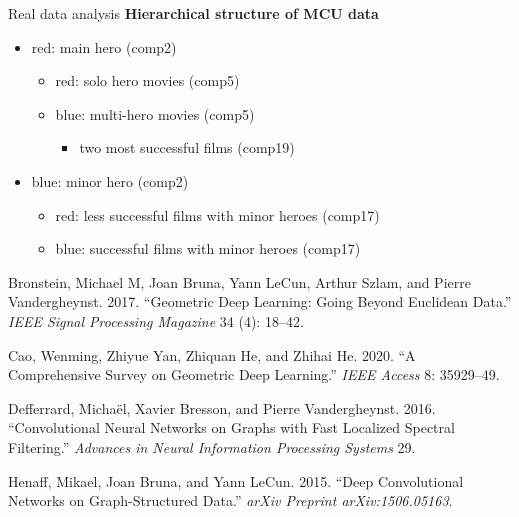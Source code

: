 \documentclass[
  ignorenonframetext,
]{beamer}
\providecommand{\tightlist}{%
  \setlength{\itemsep}{0pt}\setlength{\parskip}{0pt}}\usepackage{longtable,booktabs,array}
\newlength{\cslhangindent}
\newenvironment{CSLReferences}[2] %
 {\begin{list}{}{%
  \setlength{\itemindent}{0pt}
  \setlength{\leftmargin}{0pt}
  \setlength{\parsep}{0pt}
  \ifodd #1
   \setlength{\leftmargin}{\cslhangindent}
   \setlength{\itemindent}{-1\cslhangindent}
  \fi
  \setlength{\itemsep}{#2\baselineskip}}}
 {\end{list}}
\begin{document}
\begin{frame}{Real data analysis}
\label{real-data-analysis-7}
\textbf{Hierarchical structure of MCU data}

\begin{itemize}
\tightlist
\item
  red: main hero (comp2)

  \begin{itemize}
  \tightlist
  \item
    red: solo hero movies (comp5)
  \item
    blue: multi-hero movies (comp5)

    \begin{itemize}
    \tightlist
    \item
      two most successful films (comp19)
    \end{itemize}
  \end{itemize}
\item
  blue: minor hero (comp2)

  \begin{itemize}
  \tightlist
  \item
    red: less successful films with minor heroes (comp17)
  \item
    blue: successful films with minor heroes (comp17)
  \end{itemize}
\end{itemize}

\label{refs}
\begin{CSLReferences}{1}{0}
Bronstein, Michael M, Joan Bruna, Yann LeCun, Arthur Szlam, and Pierre
Vandergheynst. 2017. {``Geometric Deep Learning: Going Beyond Euclidean
Data.''} \emph{IEEE Signal Processing Magazine} 34 (4): 18--42.

Cao, Wenming, Zhiyue Yan, Zhiquan He, and Zhihai He. 2020. {``A
Comprehensive Survey on Geometric Deep Learning.''} \emph{IEEE Access}
8: 35929--49.

Defferrard, Michaël, Xavier Bresson, and Pierre Vandergheynst. 2016.
{``Convolutional Neural Networks on Graphs with Fast Localized Spectral
Filtering.''} \emph{Advances in Neural Information Processing Systems}
29.

Henaff, Mikael, Joan Bruna, and Yann LeCun. 2015. {``Deep Convolutional
Networks on Graph-Structured Data.''} \emph{arXiv Preprint
arXiv:1506.05163}.


\end{CSLReferences}
\end{frame}
\end{document}
